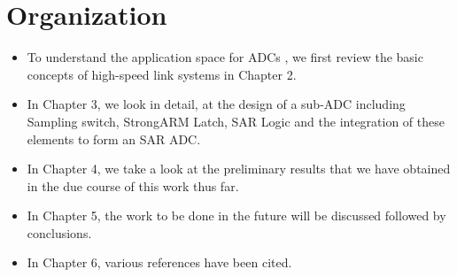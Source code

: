 \section{Organization}
\begin{itemize}
	\item To understand the application space for ADCs	, we first review the 
basic concepts of high-speed link systems in Chapter 2.
	\item In Chapter 3, we look in detail, at the design of a sub-ADC including Sampling switch, StrongARM Latch, SAR Logic and the integration of these elements to form an SAR ADC.
	\item In Chapter 4, we take a look at the preliminary results that we have obtained in the due course of this work thus far.
	\item In Chapter 5, the work to be done in the future will be discussed followed by conclusions.
	\item In Chapter 6, various references have been cited.
\end{itemize}

\newpage

